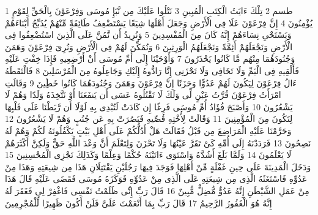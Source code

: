 \documentclass[20pt,a4paper]{article}
\title{}
\author{}
\date{}
\begin{document}
\pagecolor{cl_page}



{\tiny\colorbox{cl_aya}{1}} طسم
{\tiny\colorbox{cl_aya}{2}} تِلْكَ ءَايَتُ الْكِتَبِ الْمُبِينِ
{\tiny\colorbox{cl_aya}{3}} نَتْلُوا عَلَيْكَ مِن نَّبَإِ مُوسَى وَفِرْعَوْنَ بِالْحَقِّ لِقَوْمٍ يُؤْمِنُونَ
{\tiny\colorbox{cl_aya}{4}} إِنَّ فِرْعَوْنَ عَلَا فِى الْأَرْضِ وَجَعَلَ أَهْلَهَا شِيَعًا يَسْتَضْعِفُ طَائِفَةً مِّنْهُمْ يُذَبِّحُ أَبْنَاءَهُمْ وَيَسْتَحْىِ نِسَاءَهُمْ إِنَّهُ كَانَ مِنَ الْمُفْسِدِينَ
{\tiny\colorbox{cl_aya}{5}} وَنُرِيدُ أَن نَّمُنَّ عَلَى الَّذِينَ اسْتُضْعِفُوا فِى الْأَرْضِ وَنَجْعَلَهُمْ أَئِمَّةً وَنَجْعَلَهُمُ الْوَرِثِينَ
{\tiny\colorbox{cl_aya}{6}} وَنُمَكِّنَ لَهُمْ فِى الْأَرْضِ وَنُرِىَ فِرْعَوْنَ وَهَمَنَ وَجُنُودَهُمَا مِنْهُم مَّا كَانُوا يَحْذَرُونَ
{\tiny\colorbox{cl_aya}{7}} وَأَوْحَيْنَا إِلَى أُمِّ مُوسَى أَنْ أَرْضِعِيهِ فَإِذَا خِفْتِ عَلَيْهِ فَأَلْقِيهِ فِى الْيَمِّ وَلَا تَخَافِى وَلَا تَحْزَنِى إِنَّا رَادُّوهُ إِلَيْكِ وَجَاعِلُوهُ مِنَ الْمُرْسَلِينَ
{\tiny\colorbox{cl_aya}{8}} فَالْتَقَطَهُ ءَالُ فِرْعَوْنَ لِيَكُونَ لَهُمْ عَدُوًّا وَحَزَنًا إِنَّ فِرْعَوْنَ وَهَمَنَ وَجُنُودَهُمَا كَانُوا خَطِِٔينَ
{\tiny\colorbox{cl_aya}{9}} وَقَالَتِ امْرَأَتُ فِرْعَوْنَ قُرَّتُ عَيْنٍ لِّى وَلَكَ لَا تَقْتُلُوهُ عَسَى أَن يَنفَعَنَا أَوْ نَتَّخِذَهُ وَلَدًا وَهُمْ لَا يَشْعُرُونَ
{\tiny\colorbox{cl_aya}{10}} وَأَصْبَحَ فُؤَادُ أُمِّ مُوسَى فَرِغًا إِن كَادَتْ لَتُبْدِى بِهِ لَوْلَا أَن رَّبَطْنَا عَلَى قَلْبِهَا لِتَكُونَ مِنَ الْمُؤْمِنِينَ
{\tiny\colorbox{cl_aya}{11}} وَقَالَتْ لِأُخْتِهِ قُصِّيهِ فَبَصُرَتْ بِهِ عَن جُنُبٍ وَهُمْ لَا يَشْعُرُونَ
{\tiny\colorbox{cl_aya}{12}} وَحَرَّمْنَا عَلَيْهِ الْمَرَاضِعَ مِن قَبْلُ فَقَالَتْ هَلْ أَدُلُّكُمْ عَلَى أَهْلِ بَيْتٍ يَكْفُلُونَهُ لَكُمْ وَهُمْ لَهُ نَصِحُونَ
{\tiny\colorbox{cl_aya}{13}} فَرَدَدْنَهُ إِلَى أُمِّهِ كَىْ تَقَرَّ عَيْنُهَا وَلَا تَحْزَنَ وَلِتَعْلَمَ أَنَّ وَعْدَ اللَّهِ حَقٌّ وَلَكِنَّ أَكْثَرَهُمْ لَا يَعْلَمُونَ
{\tiny\colorbox{cl_aya}{14}} وَلَمَّا بَلَغَ أَشُدَّهُ وَاسْتَوَى ءَاتَيْنَهُ حُكْمًا وَعِلْمًا وَكَذَلِكَ نَجْزِى الْمُحْسِنِينَ
{\tiny\colorbox{cl_aya}{15}} وَدَخَلَ الْمَدِينَةَ عَلَى حِينِ غَفْلَةٍ مِّنْ أَهْلِهَا فَوَجَدَ فِيهَا رَجُلَيْنِ يَقْتَتِلَانِ هَذَا مِن شِيعَتِهِ وَهَذَا مِنْ عَدُوِّهِ فَاسْتَغَثَهُ الَّذِى مِن شِيعَتِهِ عَلَى الَّذِى مِنْ عَدُوِّهِ فَوَكَزَهُ مُوسَى فَقَضَى عَلَيْهِ قَالَ هَذَا مِنْ عَمَلِ الشَّيْطَنِ إِنَّهُ عَدُوٌّ مُّضِلٌّ مُّبِينٌ
{\tiny\colorbox{cl_aya}{16}} قَالَ رَبِّ إِنِّى ظَلَمْتُ نَفْسِى فَاغْفِرْ لِى فَغَفَرَ لَهُ إِنَّهُ هُوَ الْغَفُورُ الرَّحِيمُ
{\tiny\colorbox{cl_aya}{17}} قَالَ رَبِّ بِمَا أَنْعَمْتَ عَلَىَّ فَلَنْ أَكُونَ ظَهِيرًا لِّلْمُجْرِمِينَ
\end{document}
